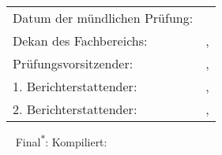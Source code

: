 %
\vspace*{\fill}%
%
%
\begin{table}[!htpb]%
\large
\begin{tabular}{>{\color{TitlePage_Color_RankB}}ll}
	\textsf{Datum der mündlichen Prüfung}:
	&%
	\DenKrTPoralExamdate%
\\%
	\textsf{Dekan des Fachbereichs}:
	&%
	\ifdefempty{\DenKrTPdeanAnrede}%
		{}%
		{\textcolor{black}{\DenKrTPdeanAnrede} }%
	\ifdefempty{\DenKrTPdeanTitleBefore}%
		{}%
		{\textcolor{black}{\DenKrTPdeanTitleBefore} }%
	\textcolor{black}{\DenKrTPdeanFirst} \textsc{\textcolor{black}{\DenKrTPdeanLast}}%
	\ifdefempty{\DenKrTPdeanTitleAfter}%
		{}%
		{, \textcolor{black}{\DenKrTPdeanTitleAfter}}%
\\%
	\textsf{Prüfungsvorsitzender}:
	&%
	\ifdefempty{\DenKrTPauditchairAnrede}%
		{}%
		{\textcolor{black}{\DenKrTPauditchairAnrede} }%
	\ifdefempty{\DenKrTPauditchairTitleBefore}%
		{}%
		{\textcolor{black}{\DenKrTPauditchairTitleBefore} }%
	\textcolor{black}{\DenKrTPauditchairFirst} \textsc{\textcolor{black}{\DenKrTPauditchairLast}}%
	\ifdefempty{\DenKrTPauditchairTitleAfter}%
		{}%
		{, \textcolor{black}{\DenKrTPauditchairTitleAfter}}%
\\%
	\textsf{1. Berichterstattender}:%
	&%
	\ifdefempty{\DenKrTPsupervisorOneAnrede}%
		{}%
		{\textcolor{black}{\DenKrTPsupervisorOneAnrede} }%
	\ifdefempty{\DenKrTPsupervisorOneTitleBefore}%
		{}%
		{\textcolor{black}{\DenKrTPsupervisorOneTitleBefore} }%
	\textcolor{black}{\DenKrTPsupervisorOneFirst} \textsc{\textcolor{black}{\DenKrTPsupervisorOneLast}}%
	\ifdefempty{\DenKrTPsupervisorOneTitleAfter}%
		{}%
		{, \textcolor{black}{\DenKrTPsupervisorOneTitleAfter}}%
\\%
	\textsf{2. Berichterstattender}:%
	&%
	\ifdefempty{\DenKrTPsupervisorTwoAnrede}%
		{}%
		{\textcolor{black}{\DenKrTPsupervisorTwoAnrede} }%
	\ifdefempty{\DenKrTPsupervisorTwoTitleBefore}%
		{}%
		{\textcolor{black}{\DenKrTPsupervisorTwoTitleBefore} }%
	\textcolor{black}{\DenKrTPsupervisorTwoFirst} \textsc{\textcolor{black}{\DenKrTPsupervisorTwoLast}}%
	\ifdefempty{\DenKrTPsupervisorTwoTitleAfter}%
		{}%
		{, \textcolor{black}{\DenKrTPsupervisorTwoTitleAfter}}%
\\%
\end{tabular}%
\end{table}%
%
\vspace*{6\baselineskip}%
%
%
\begin{flushright}%
\begin{large}%
\DenKrTPauthorFirst\ \DenKrTPauthorLast\nl%
\textsf{\color{TitlePage_Color_RankD}Final}\textsuperscript{$\ast$}: \DenKrTPdate\nl%
\textsf{\color{TitlePage_Color_RankD}Kompiliert}\textsuperscript{\dag}: \DenKrdateToday%
\end{large}%
\end{flushright}%
